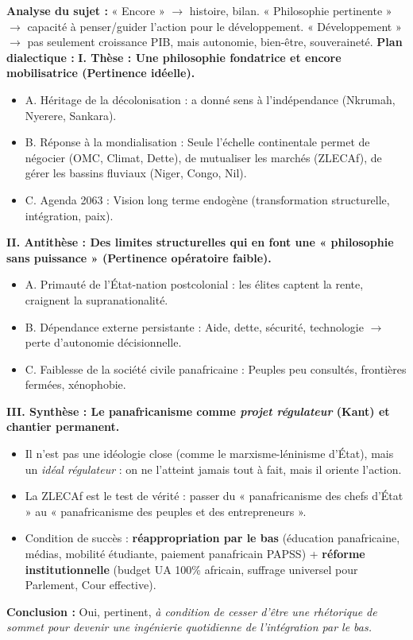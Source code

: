 \documentclass[11pt]{article}
\begin{document}
\begin{exoresolu}
\textbf{Analyse du sujet :} « Encore » $\rightarrow$ histoire, bilan. « Philosophie pertinente » $\rightarrow$ capacité à penser/guider l'action pour le développement. « Développement » $\rightarrow$ pas seulement croissance PIB, mais autonomie, bien-être, souveraineté.
\textbf{Plan dialectique :}
\textbf{I. Thèse : Une philosophie fondatrice et encore mobilisatrice (Pertinence idéelle).}
\begin{itemize}
    \item A. Héritage de la décolonisation : a donné sens à l'indépendance (Nkrumah, Nyerere, Sankara).
    \item B. Réponse à la mondialisation : Seule l'échelle continentale permet de négocier (OMC, Climat, Dette), de mutualiser les marchés (ZLECAf), de gérer les bassins fluviaux (Niger, Congo, Nil).
    \item C. Agenda 2063 : Vision long terme endogène (transformation structurelle, intégration, paix).
\end{itemize}
\textbf{II. Antithèse : Des limites structurelles qui en font une « philosophie sans puissance » (Pertinence opératoire faible).}
\begin{itemize}
    \item A. Primauté de l'État-nation postcolonial : les élites captent la rente, craignent la supranationalité.
    \item B. Dépendance externe persistante : Aide, dette, sécurité, technologie $\rightarrow$ perte d'autonomie décisionnelle.
    \item C. Faiblesse de la société civile panafricaine : Peuples peu consultés, frontières fermées, xénophobie.
\end{itemize}
\textbf{III. Synthèse : Le panafricanisme comme \emph{projet régulateur} (Kant) et chantier permanent.}
\begin{itemize}
    \item Il n'est pas une idéologie close (comme le marxisme-léninisme d'État), mais un \emph{idéal régulateur} : on ne l'atteint jamais tout à fait, mais il oriente l'action.
    \item La ZLECAf est le test de vérité : passer du « panafricanisme des chefs d'État » au « panafricanisme des peuples et des entrepreneurs ».
    \item Condition de succès : \textbf{réappropriation par le bas} (éducation panafricaine, médias, mobilité étudiante, paiement panafricain PAPSS) + \textbf{réforme institutionnelle} (budget UA 100\% africain, suffrage universel pour Parlement, Cour effective).
\end{itemize}
\textbf{Conclusion :} Oui, pertinent, \emph{à condition de cesser d'être une rhétorique de sommet pour devenir une ingénierie quotidienne de l'intégration par le bas.}
\end{exoresolu}
\end{document}
